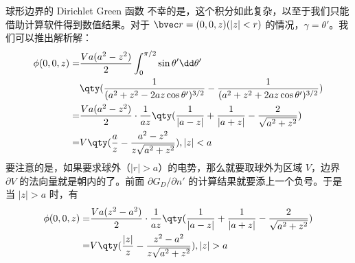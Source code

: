 \begin{example}{球形边界的 Dirichlet Green 函数}
不幸的是，这个积分如此复杂，以至于我们只能借助计算软件得到数值结果。对于 $\bvec r=(0,0,z)(|z|<r)$ 的情况，$\gamma=\theta'$。我们可以推出解析解：
\begin{equation}
\begin{aligned}
\phi(0,0,z)=&\frac{Va(a^2-z^2)}{2}\int_0^{\pi/2}\sin\theta'\dd \theta'\\
&\qty(\frac{1}{(a^2+z^2-2az\cos\theta')^{3/2}}-\frac{1}{(a^2+z^2+2az\cos\theta')^{3/2}})\\
=&\frac{Va(a^2-z^2)}{2}\cdot \frac{1}{az}\qty(\frac{1}{|a-z|}+\frac{1}{|a+z|}-\frac{2}{\sqrt{a^2+z^2}})\\
=&V\qty(\frac{a}{z}-\frac{a^2-z^2}{z\sqrt{a^2+z^2}}),    |z|<a
\end{aligned}
\end{equation}
要注意的是，如果要求球外（$|r|>a$）的电势，那么就要取球外为区域 $V$，边界 $\partial V$ 的法向量就是朝内的了。前面 $\partial G_D/\partial n'$ 的计算结果就要添上一个负号。于是当 $|z|>a$ 时，有 
\begin{equation}
\begin{aligned}
\phi(0,0,z)=&\frac{Va(z^2-a^2)}{2}\cdot \frac{1}{az}\qty(\frac{1}{|a-z|}+\frac{1}{|a+z|}-\frac{2}{\sqrt{a^2+z^2}})\\
=&V\qty(\frac{|z|}{z}-\frac{z^2-a^2}{z\sqrt{a^2+z^2}}),    |z|>a
\end{aligned}
\end{equation}
\end{example}

